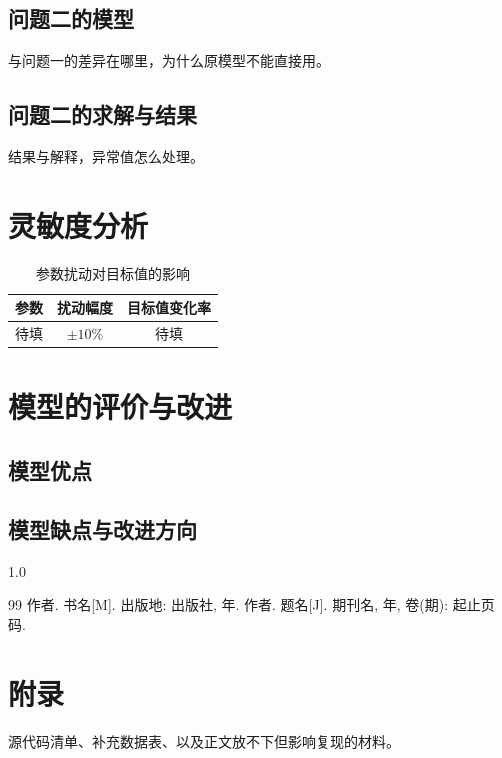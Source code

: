 \documentclass[12pt,a4paper,UTF8]{ctexart}
\begin{document}
\subsection{问题二的模型}
与问题一的差异在哪里，为什么原模型不能直接用。

\subsection{问题二的求解与结果}
结果与解释，异常值怎么处理。

\section{灵敏度分析}

\begin{table}[H]
  \centering
  \caption{参数扰动对目标值的影响}
  \begin{tabular}{ccc}
    \toprule
    参数 & 扰动幅度 & 目标值变化率 \\
    \midrule
    待填 & $\pm 10\%$ & 待填 \\
    \bottomrule
  \end{tabular}
\end{table}

\section{模型的评价与改进}

\subsection{模型优点}

\subsection{模型缺点与改进方向}

\begin{spacing}{1.0}
\begin{thebibliography}{99}
   作者. 书名[M]. 出版地: 出版社, 年.
   作者. 题名[J]. 期刊名, 年, 卷(期): 起止页码.
\end{thebibliography}
\end{spacing}

\section*{附录}
源代码清单、补充数据表、以及正文放不下但影响复现的材料。
\end{document}
